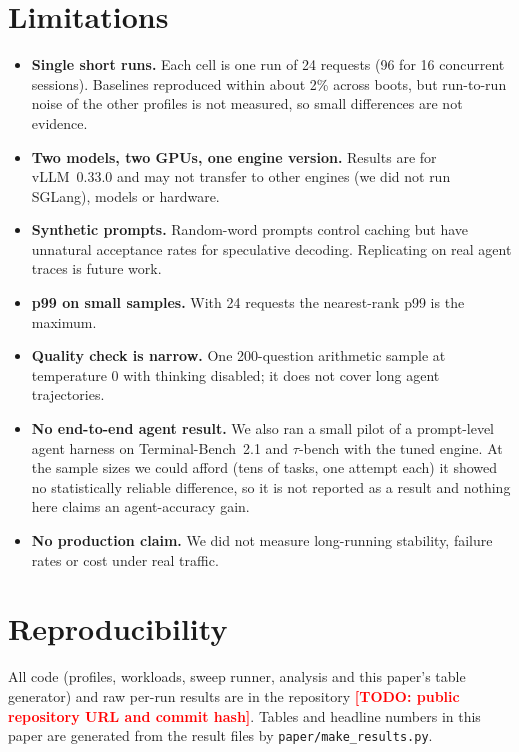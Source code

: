 \documentclass[11pt]{article}
\newcommand{\todo}[1]{\textcolor{red}{\textbf{[TODO: #1]}}}
\begin{document}
\section{Limitations}\label{sec:limits}
\begin{itemize}
  \item \textbf{Single short runs.} Each cell is one run of 24 requests (96 for 16 concurrent sessions). Baselines reproduced within about 2\% across boots, but run-to-run noise of the other profiles is not measured, so small differences are not evidence.
  \item \textbf{Two models, two GPUs, one engine version.} Results are for vLLM~0.33.0 and may not transfer to other engines (we did not run SGLang), models or hardware.
  \item \textbf{Synthetic prompts.} Random-word prompts control caching but have unnatural acceptance rates for speculative decoding. Replicating on real agent traces is future work.
  \item \textbf{p99 on small samples.} With 24 requests the nearest-rank p99 is the maximum.
  \item \textbf{Quality check is narrow.} One 200-question arithmetic sample at temperature 0 with thinking disabled; it does not cover long agent trajectories.
  \item \textbf{No end-to-end agent result.} We also ran a small pilot of a prompt-level agent harness on Terminal-Bench~2.1 and $\tau$-bench with the tuned engine. At the sample sizes we could afford (tens of tasks, one attempt each) it showed no statistically reliable difference, so it is not reported as a result and nothing here claims an agent-accuracy gain.
  \item \textbf{No production claim.} We did not measure long-running stability, failure rates or cost under real traffic.
\end{itemize}

\section{Reproducibility}
All code (profiles, workloads, sweep runner, analysis and this paper's table generator) and raw per-run results are in the repository
\todo{public repository URL and commit hash}. Tables and headline numbers in this paper are generated from the result files by \texttt{paper/make\_results.py}.




\appendix
\end{document}
